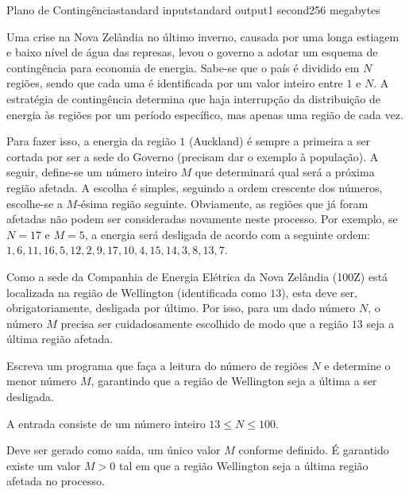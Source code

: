 \begin{problem}{Plano de Contingência}{standard input}{standard output}{1 second}{256 megabytes}

Uma crise na Nova Zelândia no último inverno, causada por uma longa estiagem e baixo nível de água das represas, levou o governo a adotar um esquema de contingência para economia de energia. Sabe-se que o país é dividido em $N$ regiões, sendo que cada uma é identificada por um valor inteiro entre $1$ e $N$. A estratégia de contingência determina que haja interrupção da distribuição de energia às regiões por um período específico, mas apenas uma região de cada vez.

Para fazer isso, a energia da região $1$ (Auckland) é sempre a primeira a ser cortada por ser a sede do Governo (precisam dar o exemplo à população). A seguir, define-se um número inteiro $M$ que determinará qual será a próxima região afetada. A escolha é simples, seguindo a ordem crescente dos números, escolhe-se a $M$-ésima região seguinte. Obviamente, as regiões que já foram afetadas não podem ser consideradas novamente neste processo. Por exemplo, se $N=17$ e $M=5$, a energia será desligada de acordo com a seguinte ordem: $1, 6, 11, 16, 5, 12, 2, 9, 17, 10, 4, 15, 14, 3, 8, 13, 7$.

Como a sede da Companhia de Energia Elétrica da Nova Zelândia (100Z) está localizada na região de Wellington (identificada como $13$), esta deve ser, obrigatoriamente, desligada por último. Por isso, para um dado número $N$, o número $M$ precisa ser cuidadosamente escolhido de modo que a região $13$ seja a última região afetada.

Escreva um programa que faça a leitura do número de regiões $N$ e determine o menor número $M$, garantindo que a região de Wellington seja a última a ser desligada.

\InputFile
A entrada consiste de um número inteiro $13 \leq N \leq 100$.

\OutputFile
Deve ser gerado como saída, um único valor $M$ conforme definido. É garantido existe um valor $M > 0$ tal em que a região Wellington seja a última região afetada no processo.

\Examples

\begin{example}
%
%
%
%
\end{example}

\end{problem}

